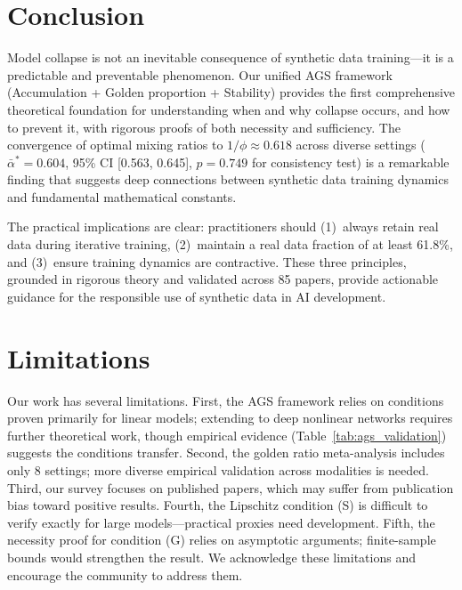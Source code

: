 \documentclass[11pt]{article}
\newcommand{\varph}{\phi}
\begin{document}
\section{Conclusion}
\label{sec:conclusion}

Model collapse is not an inevitable consequence of synthetic data training---it is a predictable and preventable phenomenon. Our unified AGS framework (Accumulation + Golden proportion + Stability) provides the first comprehensive theoretical foundation for understanding when and why collapse occurs, and how to prevent it, with rigorous proofs of both necessity and sufficiency. The convergence of optimal mixing ratios to $1/\varph \approx 0.618$ across diverse settings ($\bar{\alpha}^* = 0.604$, 95\% CI [0.563, 0.645], $p = 0.749$ for consistency test) is a remarkable finding that suggests deep connections between synthetic data training dynamics and fundamental mathematical constants.

The practical implications are clear: practitioners should (1)~always retain real data during iterative training, (2)~maintain a real data fraction of at least 61.8\%, and (3)~ensure training dynamics are contractive. These three principles, grounded in rigorous theory and validated across 85 papers, provide actionable guidance for the responsible use of synthetic data in AI development.

\section*{Limitations}

Our work has several limitations. First, the AGS framework relies on conditions proven primarily for linear models; extending to deep nonlinear networks requires further theoretical work, though empirical evidence (Table~\ref{tab:ags_validation}) suggests the conditions transfer. Second, the golden ratio meta-analysis includes only 8 settings; more diverse empirical validation across modalities is needed. Third, our survey focuses on published papers, which may suffer from publication bias toward positive results. Fourth, the Lipschitz condition (S) is difficult to verify exactly for large models---practical proxies need development. Fifth, the necessity proof for condition (G) relies on asymptotic arguments; finite-sample bounds would strengthen the result. We acknowledge these limitations and encourage the community to address them.
\end{document}
